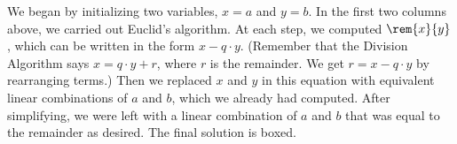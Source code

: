 \documentclass[handout]{mcs}
\begin{document}
We began by initializing two variables, $x = a$ and $y = b$.  In the
first two columns above, we carried out Euclid's algorithm.  At each
step, we computed $\rem{x}{y}$, which can be written in the form $x - q
\cdot y$.  (Remember that the Division Algorithm says $x = q \cdot y +
r$, where $r$ is the remainder.  We get $r = x - q \cdot y$ by
rearranging terms.)  Then we replaced $x$ and $y$ in this equation
with equivalent linear combinations of $a$ and $b$, which we already
had computed.  After simplifying, we were left with a linear
combination of $a$ and $b$ that was equal to the remainder as desired.
The final solution is boxed.




\end{document}
